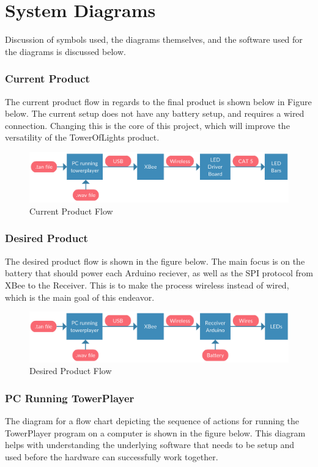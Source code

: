 \documentclass[12pt]{article}
\begin{document}
{\section{System Diagrams}
	Discussion of symbols used, the diagrams themselves, and the software used for the diagrams is discussed below.
	
	\subsubsection{Current Product}
	The current product flow in regards to the final product is shown below in Figure below. The current setup does not have any battery setup, and requires a wired connection. Changing this is the core of this project, which will improve the versatility of the TowerOfLights product.
	
		\begin{figure}[ht!]
			\centering
			\includegraphics[width=170mm]{assets/What_We_Have.png}
			\caption{Current Product Flow \label{overflow}}
		\end{figure}
	
	
	\subsubsection{Desired Product}
	The desired product flow is shown in the figure below. The main focus is on the battery that should power each Arduino reciever, as well as the SPI protocol from XBee to the Receiver. This is to make the process wireless instead of wired, which is the main goal of this endeavor.
	
	\begin{figure}[ht!]
		\centering
		\includegraphics[width=170mm]{assets/What_We_Want.png}
		\caption{Desired Product Flow \label{overflow}}
	\end{figure}


	\subsubsection{PC Running TowerPlayer}
	The diagram for a flow chart depicting the sequence of actions for running the TowerPlayer program on a computer is shown in the figure below. This diagram helps with understanding the underlying software that needs to be setup and used before the hardware can successfully work together.
	
}
\end{document}
